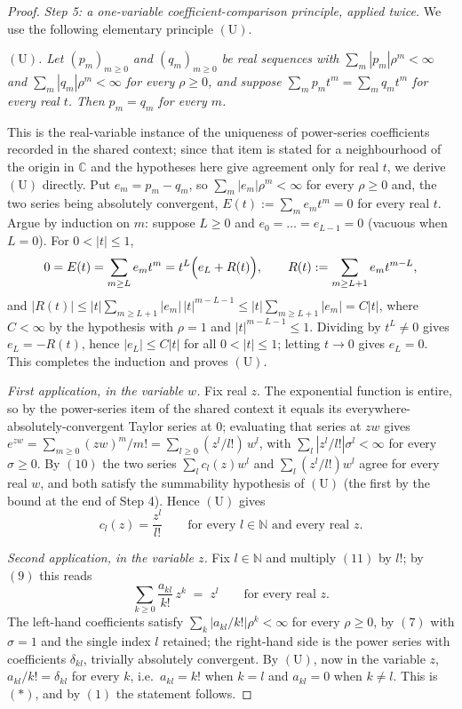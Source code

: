 \begin{proof}
\emph{Step 5: a one-variable coefficient-comparison principle, applied twice.}
We use the following elementary principle $(\mathrm{U})$.

\smallskip
\noindent\emph{$(\mathrm{U})$.  Let $(p_m)_{m\geq0}$ and $(q_m)_{m\geq0}$ be real
sequences with $\sum_m |p_m|\rho^m < \infty$ and $\sum_m |q_m|\rho^m < \infty$
for every $\rho \geq 0$, and suppose $\sum_m p_m t^m = \sum_m q_m t^m$ for every
real $t$.  Then $p_m = q_m$ for every $m$.}

\smallskip
\noindent This is the real-variable instance of the uniqueness of power-series
coefficients recorded in the shared context; since that item is stated for a
neighbourhood of the origin in $\mathbb{C}$ and the hypotheses here give
agreement only for real $t$, we derive $(\mathrm{U})$ directly.  Put
$e_m = p_m - q_m$, so $\sum_m |e_m| \rho^m < \infty$ for every $\rho \geq 0$ and,
the two series being absolutely convergent, $E(t) := \sum_m e_m t^m = 0$ for
every real $t$.  Argue by induction on $m$: suppose $L \geq 0$ and
$e_0 = \dots = e_{L-1} = 0$ (vacuous when $L = 0$).  For $0 < |t| \leq 1$,
\[
  0 = E(t) = \sum_{m \geq L} e_m t^m = t^L\Bigl(e_L + R(t)\Bigr),
  \qquad
  R(t) := \sum_{m\geq L+1} e_m t^{m-L},
\]
and $|R(t)| \leq |t| \sum_{m\geq L+1} |e_m|\,|t|^{m-L-1}
\leq |t|\sum_{m\geq L+1}|e_m| = C|t|$, where $C < \infty$ by the hypothesis with
$\rho = 1$ and $|t|^{m-L-1}\le1$.  Dividing by $t^L \neq 0$ gives
$e_L = -R(t)$, hence $|e_L| \leq C|t|$ for all $0 < |t| \leq 1$; letting
$t \to 0$ gives $e_L = 0$.  This completes the induction and proves
$(\mathrm{U})$.

\emph{First application, in the variable $w$.}  Fix real $z$.  The exponential
function is entire, so by the power-series item of the shared context it equals
its everywhere-absolutely-convergent Taylor series at $0$; evaluating that series
at $zw$ gives
$e^{zw} = \sum_{m\geq0} (zw)^m/m! = \sum_{l\geq0} (z^l/l!)\,w^l$, with
$\sum_l |z^l/l!|\sigma^l < \infty$ for every $\sigma \geq 0$.  By $(10)$ the two
series $\sum_l c_l(z) w^l$ and $\sum_l (z^l/l!) w^l$ agree for every real $w$,
and both satisfy the summability hypothesis of $(\mathrm{U})$ (the first by the
bound at the end of Step 4).  Hence $(\mathrm{U})$ gives
\begin{equation*}
  c_l(z) = \frac{z^l}{l!} \qquad\text{for every } l \in \mathbb{N}
  \text{ and every real } z .
  \tag{11}
\end{equation*}

\emph{Second application, in the variable $z$.}  Fix $l \in \mathbb{N}$ and
multiply $(11)$ by $l!$; by $(9)$ this reads
\[
  \sum_{k\geq0} \frac{a_{kl}}{k!}\, z^k \;=\; z^l
  \qquad\text{for every real } z .
\]
The left-hand coefficients satisfy $\sum_k |a_{kl}/k!|\rho^k < \infty$ for every
$\rho \geq 0$, by $(7)$ with $\sigma = 1$ and the single index $l$ retained; the
right-hand side is the power series with coefficients $\delta_{kl}$, trivially
absolutely convergent.  By $(\mathrm{U})$, now in the variable $z$,
$a_{kl}/k! = \delta_{kl}$ for every $k$, i.e.\ $a_{kl} = k!$ when $k = l$ and
$a_{kl} = 0$ when $k \neq l$.  This is $(\ast)$, and by $(1)$ the statement
follows.
\end{proof}
